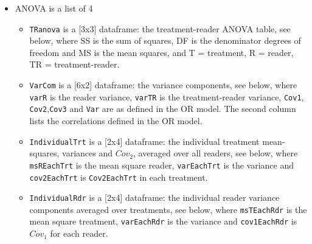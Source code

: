 \documentclass[
]{book}
\providecommand{\tightlist}{%
  \setlength{\itemsep}{0pt}\setlength{\parskip}{0pt}}
\begin{document}
\begin{itemize}
\tightlist
\item
  ANOVA is a list of 4

  \begin{itemize}
  \tightlist
  \item
    \texttt{TRanova} is a {[}3x3{]} dataframe: the treatment-reader ANOVA table, see below, where SS is the sum of squares, DF is the denominator degrees of freedom and MS is the mean squares, and T = treatment, R = reader, TR = treatment-reader.\\
  \item
    \texttt{VarCom} is a {[}6x2{]} dataframe: the variance components, see below, where \texttt{varR} is the reader variance, \texttt{varTR} is the treatment-reader variance, \texttt{Cov1}, \texttt{Cov2},\texttt{Cov3} and \texttt{Var} are as defined in the OR model. The second column lists the correlations defined in the OR model.
  \item
    \texttt{IndividualTrt} is a {[}2x4{]} dataframe: the individual treatment mean-squares, variances and \(Cov_2\), averaged over all readers, see below, where \texttt{msREachTrt} is the mean square reader, \texttt{varEachTrt} is the variance and \texttt{cov2EachTrt} is \texttt{Cov2EachTrt} in each treatment.
  \item
    \texttt{IndividualRdr} is a {[}2x4{]} dataframe: the individual reader variance components averaged over treatments, see below, where \texttt{msTEachRdr} is the mean square treatment, \texttt{varEachRdr} is the variance and \texttt{cov1EachRdr} is \(Cov_1\) for each reader.
  \end{itemize}
\end{itemize}
\end{document}
